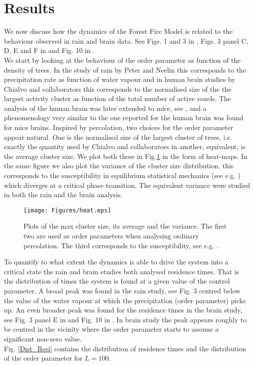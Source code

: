 \documentclass[aps,prl,showpacs,superscriptaddress,groupedaddress,notitlepage]{revtex4-1}
\begin{document}
\section{Results}

We now discuss how the dynamics of the Forest Fire Model is related to the behaviour observed in rain and brain data. See Figs. 1 and 3 in \cite{Peters_Neelin2006}, Figs. 3 panel C, D, E and F in \cite{Chialvo2012} and Fig. 10 in \cite{Scott2014}.
\\We start by looking at the behaviour of the order parameter as function of the density of trees. In the study of rain by Peter and Neelin\cite{Peters_Neelin2006} this corresponds to the precipitation rate as function of water vapour and in human brain studies by Chialvo and collaborators\cite{Chialvo2012} this corresponds to the  normalised size of the the largest activity cluster as function of the total number of active voxels. The analysis of the human brain was later extended to mice, see \cite{Scott2014,Fagerholm2016}, and a phenomenology very similar to the one reported for the human brain was found for mice brains. Inspired by percolation, two choices for the order parameter appear natural. One is the normalised size of the largest cluster of trees, i.e. exactly the quantity used by Chialvo and collaborators in \cite{Chialvo2012} another, equivalent, is the average cluster size. We plot both these in Fig.\ref{Order_para_Suscep} in the form of heat-maps. In the same figure we also plot the variance of the cluster size distribution, this corresponds to the susceptibility in equilibrium statistical mechanics (see e.g. \cite{Ma1985}) which diverges at a critical phase transition. The equivalent variance were studied in both the rain and the brain analysis.  

\begin{figure}[!h]
\centering
\texttt{[image: Figures/heat.eps]}\\
  
\caption{Plots of the max cluster size, its average and the variance. The first two are used as order parameters when analysing ordinary percolation\cite{Christensen_Moloney2005}. The third corresponds to the susceptibility, see e.g. \cite{Ma1985}.  }
\label{Order_para_Suscep}
\end{figure}


To quantify to what extent the dynamics is able to drive the system into a critical state the rain and brain studies both analysed residence times. That is the distribution of times the system is found at a given value of the control parameter. A broad peak was found in the rain study, see Fig. 3 \cite{Peters_Neelin2006} centred below the value of the water vapour at which the precipitation (order parameter) picks up. An even broader peak was found for the residence times in the brain study, see Fig. 3 panel E in \cite{Chialvo2012} and Fig. 10 in \cite{Scott2014}. In brain study the peak appears roughly to be centred in the vicinity where the order parameter starts to assume a significant non-zero value. 
\\Fig. \ref{Dist_Resi} contains the distribution of residence times and the distribution of the order parameter for $L=100$. 
\end{document}
